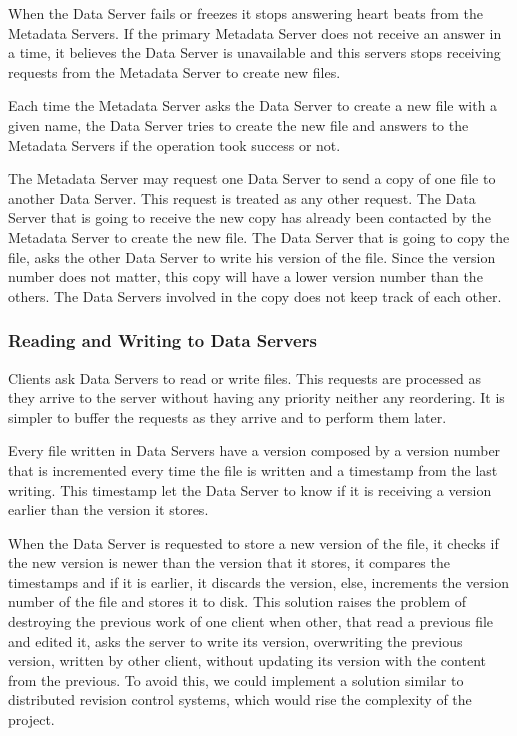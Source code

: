 When the Data Server fails or freezes it stops answering heart beats from
the Metadata Servers. If the primary Metadata Server does not receive an
answer in a time, it believes the Data Server is unavailable
and this servers stops receiving requests from the Metadata Server to
create new files.

Each time the Metadata Server asks the Data Server to create a new file
with a given name, the Data Server tries to create the new file and answers
to the Metadata Servers if the operation took success or not.

The Metadata Server may request one Data Server to send a copy of one file
to another Data Server. This request is treated as any other request.
The Data Server that is going to receive the new copy has already been
contacted by the Metadata Server to create the new file. The Data Server
that is going to copy the file, asks the other Data Server to write his
version of the file. Since the version number does not matter, this copy will
have a lower version number than the others. The Data Servers involved in the
copy does not keep track of each other.

\subsubsection{Reading and Writing to Data Servers}

Clients ask Data Servers to read or write files. This requests are
processed as they arrive to the server without having any priority neither
any reordering. It is simpler to buffer the requests as they arrive and to
perform them later.

Every file written in Data Servers have a version composed by a version
number that is incremented every time the file is written and a timestamp
from the last writing. This timestamp let the Data Server to know if it is
receiving a version earlier than the version it stores.

When the Data Server is requested to store a new version of the file, it
checks if the new version is newer than the version that it stores, it
compares the timestamps and if it is earlier, it discards the version, else,
increments the version number of the file and stores it to disk.
This solution raises the problem of destroying the previous work of one
client when other, that read a previous file and edited it, asks the server
to write its version, overwriting the previous version, written by other
client, without updating its version with the content from the previous. To
avoid this, we could implement a solution similar to distributed revision
control systems, which would rise the complexity of the project.